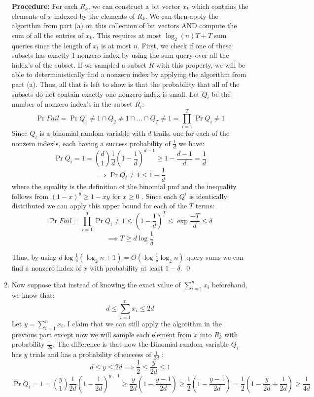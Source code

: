 \documentclass[12pt]{article}
\begin{document}
\begin{solution}
\begin{enumerate}[label=(\alph*)]
\textbf{Procedure:} For each $R_k$, we can construct a bit vector $x_k$ which contains the elements of $x$ indexed by the elements of $R_k$. We can then apply the algorithm from part (a) on this collection of bit vectors AND compute the sum of all the entries of $x_k$. This requires at most $\log_2(n)T + T$ sum queries since the length of $x_t$ is at most $n$. First, we check if one of these subsets has exactly $1$ nonzero index by using the sum query over all the index's of the subset. If we sampled a subset $R$ with this property, we will be able to  deterministically find a nonzero index by applying the algorithm from part (a). Thus, all that is left to show is that the probability that all of the subsets do not contain exactly one nonzero index is small. Let $Q_{i}$ be the number of nonzero index's in the subset $R_i$:
\[
\Pr{Fail} = \Pr{Q_{1} \neq 1 \cap Q_{2} \neq 1 \cap ... \cap Q_{T} \neq 1} = \prod_{i = 1}^{T}{\Pr{Q_i \neq 1}}
\]
Since $Q_i$ is a binomial random variable with $d$ trails, one for each of the nonzero index's, each having a success probability of $\frac{1}{d}$ we have:
\[
\Pr{Q_i = 1} = \binom{d}{1}\frac{1}{d}(1 - \frac{1}{d})^{d-1} \geq 1 - \frac{d-1}{d}= \frac{1}{d}
\]
\[
\implies \Pr{Q_i \neq 1} \leq 1 -\frac{1}{d}
\]
where the equality is the definition of the binomial pmf and the inequality follows from $(1 - x)^y \geq 1-xy$ for $x \geq 0$ .
Since each $Q^i$ is identically distributed we can apply this upper bound for each of the $T$ terms:
\[
\Pr{Fail} = \prod_{i = 1}^{T}{\Pr{Q_i \neq 1}} \leq (1 - \frac{1}{d})^T \leq \exp{\frac{-T}{d}} \leq \delta
\]
\[
\implies T \geq d\log{\frac{1}{\delta}}
\]

Thus, by using $d\log{\frac{1}{\delta}} (\log_{2}{n} + 1) = O(\log{\frac{1}{\delta}}\log_{2}{n})$ query sums we can find a nonzero index of $x$ with probability at least $1-\delta$. \qed
\item Now suppose that instead of knowing the exact value of $\sum_{i=1}^{n}{x_i}$ beforehand, we know that:
\[
d \leq \sum_{i=1}^{n}{x_i} \leq 2d
\]
Let $y=\sum_{i=1}^{n}{x_i}$. I claim that we can still apply the algorithm in the previous part except now we will sample each element from $x$ into $R_k$ with probability $\frac{1}{2d}$. The difference is that now the Binomial random variable $Q_i$ has $y$ trials and has a probability of success of $\frac{1}{2d}$ :
\[
d \leq y \leq 2d \implies \frac{1}{2} \leq \frac{y}{2d} \leq 1
\]
\[
\Pr{Q_i = 1} = \binom{y}{1}\frac{1}{2d}(1 - \frac{1}{2d})^{y-1} \geq \frac{y}{2d}(1-\frac{y-1}{2d}) \geq \frac{1}{2}(1-\frac{y-1}{2d}) = \frac{1}{2}(1-\frac{y}{2d} + \frac{1}{2d}) \geq \frac{1}{4d}
\]


\end{enumerate}
\end{solution}
\end{document}
